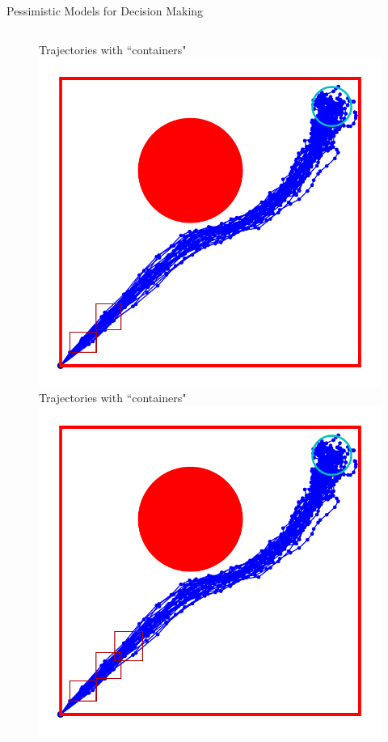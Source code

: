 \documentclass[lecture]{beamer}
\begin{document}
\begin{frame}{\normalsize Pessimistic Models for Decision Making}
\begin{columns}[t]
\begin{overlayarea}{\textwidth}{0.6\textheight}
\begin{figure}
{        }%
        {%
                \center
        Trajectories with ``containers"
  \includegraphics[width=\FS\textwidth]{Codes/BasicsSafety/PessimisticModel2.pdf}%
        }%
        {%
                \center
        Trajectories with ``containers"
  \includegraphics[width=\FS\textwidth]{Codes/BasicsSafety/PessimisticModel3.pdf}%
}
\end{figure}
\end{overlayarea}
\end{columns}
\end{frame}
\end{document}
